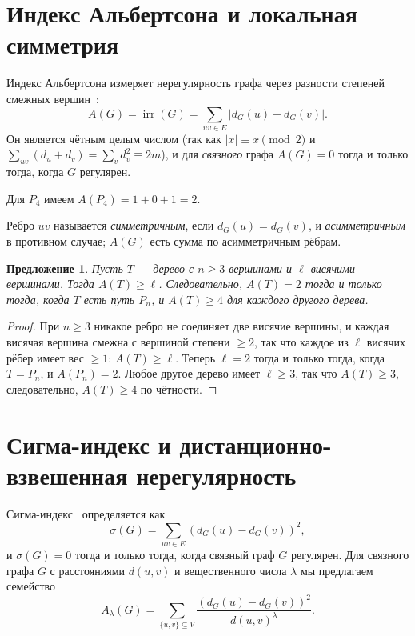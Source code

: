 \documentclass[a4paper,14pt]{extreport}
\theoremstyle{plain}
\newtheorem{proposition}[theorem]{Предложение}
\theoremstyle{definition}
\theoremstyle{remark}
\begin{document}
\section{Индекс Альбертсона и локальная симметрия}

Индекс Альбертсона измеряет нерегулярность графа через разности степеней смежных вершин~\cite{Albertson1997}:
\begin{equation}
	A(G)=\operatorname{irr}(G)=\sum_{uv\in E}|d_G(u)-d_G(v)| .
\end{equation}
Он является чётным целым числом (так как $|x|\equiv x\pmod2$ и $\sum_{uv}(d_u+d_v)=\sum_v d_v^2\equiv2m$), и для \emph{связного} графа $A(G)=0$ тогда и только тогда, когда $G$ регулярен.

Для $P_4$ имеем $A(P_4)=1+0+1=2$.

Ребро $uv$ называется \emph{симметричным}, если $d_G(u)=d_G(v)$, и \emph{асимметричным} в противном случае; $A(G)$ есть сумма по асимметричным рёбрам.

\begin{proposition}
	Пусть $T$ --- дерево с $n\ge3$ вершинами и $\ell$ висячими вершинами. Тогда $A(T)\ge\ell$. Следовательно, $A(T)=2$ тогда и только тогда, когда $T$ есть путь $P_n$, и $A(T)\ge4$ для каждого другого дерева.
\end{proposition}
\begin{proof}
	При $n\ge3$ никакое ребро не соединяет две висячие вершины, и каждая висячая вершина смежна с вершиной степени $\ge2$, так что каждое из $\ell$ висячих рёбер имеет вес $\ge1$: $A(T)\ge\ell$. Теперь $\ell=2$ тогда и только тогда, когда $T=P_n$, и $A(P_n)=2$.
	Любое другое дерево имеет $\ell\ge3$, так что $A(T)\ge3$, следовательно, $A(T)\ge4$ по чётности.
\end{proof}
\section{Сигма-индекс и дистанционно-взвешенная нерегулярность}

Сигма-индекс~\cite{Gutman2018} определяется как
\begin{equation}
	\sigma(G)=\sum_{uv\in E}(d_G(u)-d_G(v))^2 ,
\end{equation}
и $\sigma(G)=0$ тогда и только тогда, когда связный граф $G$ регулярен. Для связного графа $G$ с расстояниями $d(u,v)$ и вещественного числа $\lambda$ мы предлагаем семейство
\begin{equation}
	A_\lambda(G)=\sum_{\{u,v\}\subseteq V}\frac{(d_G(u)-d_G(v))^2}{d(u,v)^{\lambda}} .
\end{equation}
\end{document}

